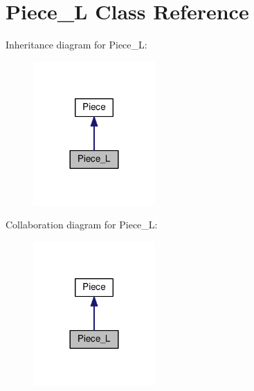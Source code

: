 \hypertarget{classPiece__L}{}\section{Piece\+\_\+L Class Reference}
\label{classPiece__L}


Inheritance diagram for Piece\+\_\+L\+:
\nopagebreak
\begin{figure}[H]
\begin{center}
\leavevmode
\includegraphics[width=132pt]{classPiece__L__inherit__graph}
\end{center}
\end{figure}


Collaboration diagram for Piece\+\_\+L\+:
\nopagebreak
\begin{figure}[H]
\begin{center}
\leavevmode
\includegraphics[width=132pt]{classPiece__L__coll__graph}
\end{center}
\end{figure}
